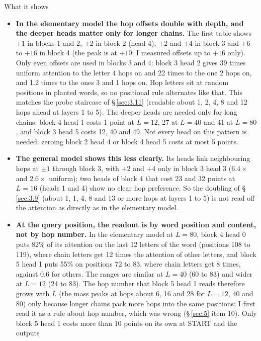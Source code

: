 \documentclass[paper=a4,fontsize=11pt,DIV=11,parskip=half,headings=small,numbers=noendperiod]{scrartcl}
\DeclareRobustCommand{\lead}[1]{\textsf{\bfseries\color{accent}#1}}
\begin{document}
\begin{findbox}{What it shows}
\begin{itemize}
  yet it costs more than any other head at $L=8$ (0.69) and 0.20 at $L=16$ (0.13 with the mean): I do not know
  what it does.
\item \lead{In the elementary model the hop offsets double with depth, and the deeper heads matter only for
  longer chains.} The first table shows $\pm1$ in blocks 1 and 2, $\pm2$ in block 2 (head 4), $\pm2$ and $\pm4$
  in block 3 and $+6$ to $+16$ in block 4 (the peak is at $+10$; I measured offsets up to $+16$ only). Only even
  offsets are used in blocks 3 and 4: block 3 head 2 gives 39 times uniform attention to the letter 4 hops on
  and 22 times to the one 2 hops on, and 1.2 times to the ones 3 and 1 hops on. Hop letters sit at random
  positions in planted words, so no positional rule alternates like that. This matches the probe staircase of
  \S\,\ref{sec:3.11} (readable about 1, 2, 4, 8 and 12 hops ahead at layers 1 to 5). The deeper heads are needed
  only for long chains: block 4 head 1 costs 1 point at $L=12$, 27 at $L=40$ and 41 at $L=80$, and block 3 head
  5 costs 12, 40 and 49. Not every head on this pattern is needed: zeroing block 2 head 4 or block 4 head 5
  costs at most 5 points.
\item \lead{The general model shows this less clearly.} Its heads link neighbouring hops at $\pm1$ through block
  3, with $+2$ and $+4$ only in block 3 head 3 ($6.4\times$ and $2.6\times$ uniform); two heads of block 4 that
  cost 23 and 32 points at $L=16$ (heads 1 and 4) show no clear hop preference. So the doubling of
  \S\,\ref{sec:3.9} (about 1, 1, 4, 8 and 13 or more hops at layers 1 to 5) is not read off the attention as
  directly as in the elementary model.
\item \lead{At the query position, the readout is by word position and content, not by hop number.} In the
  elementary model at $L=80$, block 4 head 0 puts 82\% of its attention on the last 12 letters of the word
  (positions 108 to 119), where chain letters get 12 times the attention of other letters, and block 5 head 1
  puts 55\% on positions 72 to 83, where chain letters get 8 times, against 0.6 for others. The ranges are
  similar at $L=40$ (60 to 83) and wider at $L=12$ (24 to 83). The hop number that block 5 head 1 reads
  therefore grows with $L$ (the mass peaks at hops about 6, 16 and 28 for $L=12$, 40 and 80) only because longer
  chains pack more hops into the same positions; I first read it as a rule about hop number, which was wrong
  (\S\,\ref{sec:5} item 10). Only block 5 head 1 costs more than 10 points on its own at START and the outputs

\end{itemize}
\end{findbox}
\end{document}

